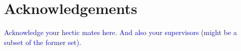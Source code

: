 \section*{Acknowledgements}

\newlength\oldparskip
\setlength{\oldparskip}{\parskip}
\setlength{\parskip}{1cm}

{\noindent
\textcolor{blue}{Acknowledge your hectic mates here. And also your supervisors (might be a subset of the former set).}
}

%


\setlength{\parskip}{\oldparskip}
